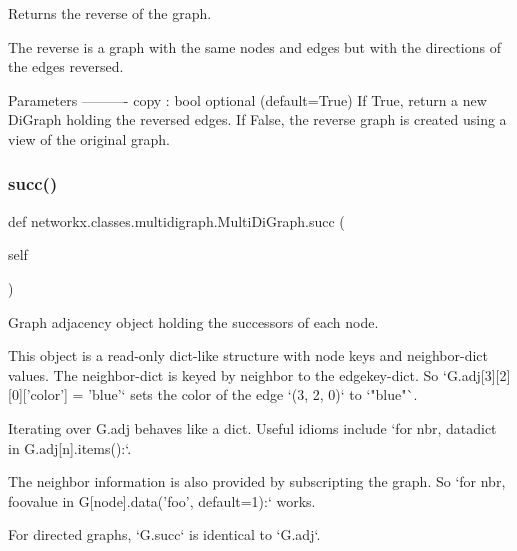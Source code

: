 \begin{DoxyVerb}Returns the reverse of the graph.

The reverse is a graph with the same nodes and edges
but with the directions of the edges reversed.

Parameters
----------
copy : bool optional (default=True)
    If True, return a new DiGraph holding the reversed edges.
    If False, the reverse graph is created using a view of
    the original graph.
\end{DoxyVerb}
 \mbox{\label{classnetworkx_1_1classes_1_1multidigraph_1_1MultiDiGraph_ae9c211f47e47ad671cfa48d3af7d3d38}} 
\subsubsection{\texorpdfstring{succ()}{succ()}}
{\footnotesize\ttfamily def networkx.\+classes.\+multidigraph.\+Multi\+Di\+Graph.\+succ (\begin{DoxyParamCaption}\item[{}]{self }\end{DoxyParamCaption})}

\begin{DoxyVerb}Graph adjacency object holding the successors of each node.

This object is a read-only dict-like structure with node keys
and neighbor-dict values.  The neighbor-dict is keyed by neighbor
to the edgekey-dict.  So `G.adj[3][2][0]['color'] = 'blue'` sets
the color of the edge `(3, 2, 0)` to `"blue"`.

Iterating over G.adj behaves like a dict. Useful idioms include
`for nbr, datadict in G.adj[n].items():`.

The neighbor information is also provided by subscripting the graph.
So `for nbr, foovalue in G[node].data('foo', default=1):` works.

For directed graphs, `G.succ` is identical to `G.adj`.
\end{DoxyVerb}
 \mbox{\label{classnetworkx_1_1classes_1_1multidigraph_1_1MultiDiGraph_a25c55ef57000f8467da36bca3989930e}} 
